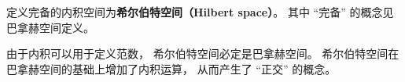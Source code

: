 
\begin{issues}
\issueDraft
\end{issues}


定义完备的内积空间为\textbf{希尔伯特空间（Hilbert space）}。 其中 “完备” 的概念见巴拿赫空间定义。

由于内积可以用于定义范数， 希尔伯特空间必定是巴拿赫空间。 希尔伯特空间在巴拿赫空间的基础上增加了内积运算， 从而产生了 “正交” 的概念。
